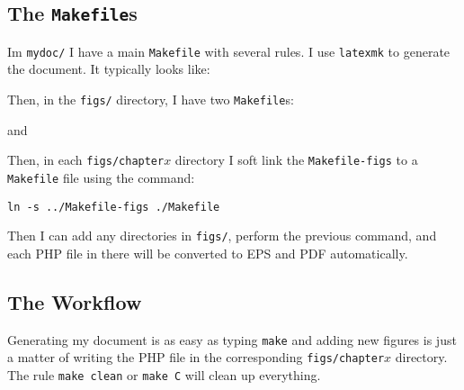 \documentclass[10pt,a4paper]{scrartcl}
\begin{document}
\subsection{The \texttt{Makefile}s}
Im \texttt{mydoc/} I have a main \texttt{Makefile} with several rules. I use
\texttt{latexmk} to generate the document. It typically looks like:


Then, in the \texttt{figs/} directory, I have two \texttt{Makefile}s:

and

Then, in each \texttt{figs/chapter$x$} directory I soft link the \texttt{Makefile-figs}
to a \texttt{Makefile} file using the command:
\begin{center}
\texttt{ln -s ../Makefile-figs ./Makefile}
\end{center}
Then I can add any directories in \texttt{figs/}, perform the previous command, and each PHP
file in there will be converted to EPS and PDF automatically.

\subsection{The Workflow}
Generating my document is as easy as typing \lstinline{make} and adding new figures is just a matter
of writing the PHP file in the corresponding \texttt{figs/chapter$x$} directory.
The rule \texttt{make clean} or \texttt{make C} will clean up everything.
\end{document}
